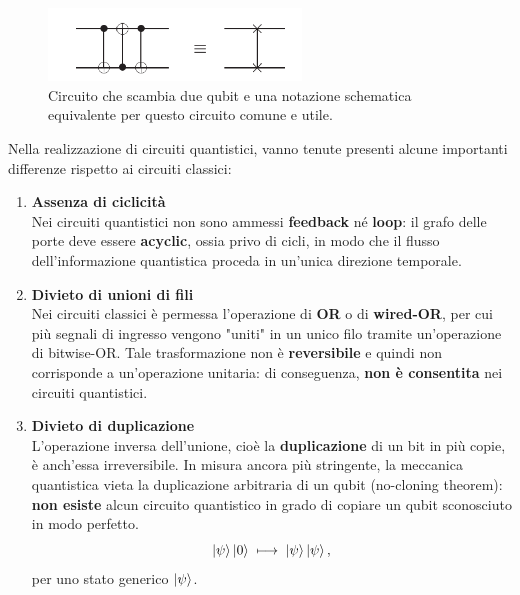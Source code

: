 \documentclass[a4paper,12pt]{report}
\theoremstyle{plain}
\begin{document}
\begin{figure}[H]
    \centering
    \includegraphics[width=0.6\textwidth]{Immagine6.png} 
    \caption{Circuito che scambia due qubit e una notazione schematica equivalente per questo circuito comune e utile.}
    \label{Immagine6}
\end{figure}
\noindent Nella realizzazione di circuiti quantistici, vanno tenute presenti alcune importanti differenze rispetto ai circuiti classici:
\begin{enumerate}[leftmargin=*, labelwidth=\widthof{\bfseries Divieto di duplicazione}, label=\textbf{\arabic*.}]
    \item \textbf{Assenza di ciclicità} \\
    Nei circuiti quantistici non sono ammessi \textbf{feedback} né \textbf{loop}: il grafo delle porte deve essere \textbf{acyclic}, ossia privo di cicli, in modo che il flusso dell'informazione quantistica proceda in un'unica direzione temporale.
    
    \item \textbf{Divieto di unioni di fili} \\
    Nei circuiti classici è permessa l'operazione di \textbf{OR} o di \textbf{wired-OR}, per cui più segnali di ingresso vengono "uniti" in un unico filo tramite un'operazione di bitwise-OR. Tale trasformazione non è \textbf{reversibile} e quindi non corrisponde a un'operazione unitaria: di conseguenza, \textbf{non è consentita} nei circuiti quantistici.
    
    \item \textbf{Divieto di duplicazione} \\
    L'operazione inversa dell'unione, cioè la \textbf{duplicazione} di un bit in più copie, è anch'essa irreversibile. In misura ancora più stringente, la meccanica quantistica vieta la duplicazione arbitraria di un qubit (no-cloning theorem): \textbf{non esiste} alcun circuito quantistico in grado di copiare un qubit sconosciuto in modo perfetto. 
    \begin{equation}
        \ket{\psi}\ket{0} \;\longmapsto\; \ket{\psi}\ket{\psi},
    \end{equation}
    per uno stato generico $\ket{\psi}$.
\end{enumerate}
\vspace{1em}
\end{document}
